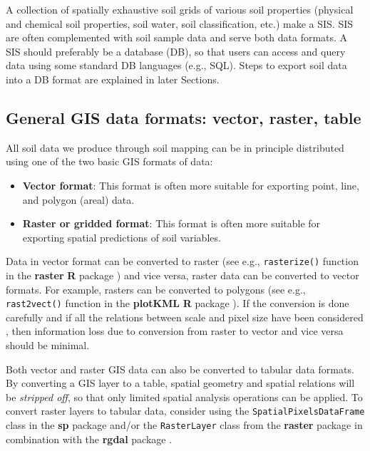 \documentclass[10pt,b5paper,]{book}
\providecommand{\tightlist}{%
  \setlength{\itemsep}{0pt}\setlength{\parskip}{0pt}}
\theoremstyle{definition}
\theoremstyle{definition}
\theoremstyle{definition}
\theoremstyle{remark}
\begin{document}
A collection of spatially exhaustive soil grids of various soil
properties (physical and chemical soil properties, soil water, soil
classification, etc.) make a SIS. SIS are often complemented with soil
sample data and serve both data formats. A SIS should preferably be a
database (DB), so that users can access and query data using some
standard DB languages (e.g., SQL). Steps to export soil data into a DB
format are explained in later Sections.

\hypertarget{general-gis-data-formats-vector-raster-table}{%
\subsection{General GIS data formats: vector, raster,
table}\label{general-gis-data-formats-vector-raster-table}}

All soil data we produce through soil mapping can be in principle
distributed using one of the two basic GIS formats of data:

\begin{itemize}
\tightlist
\item
  \textbf{Vector format}: This format is often more suitable for
  exporting point, line, and polygon (areal) data.
\item
  \textbf{Raster or gridded format}: This format is often more suitable
  for exporting spatial predictions of soil variables.
\end{itemize}

Data in vector format can be converted to raster (see e.g.,
\texttt{rasterize()} function in the \textbf{raster} \textbf{R} package
) and vice versa, raster data can be converted to vector formats. For
example, rasters can be converted to polygons (see e.g.,
\texttt{rast2vect()} function in the \textbf{plotKML} \textbf{R} package
). If the conversion is done carefully and if all the relations between
scale and pixel size have been considered \citep[see][ for more
details]{hengl2006finding}, then information loss due to conversion from
raster to vector and vice versa should be minimal.

Both vector and raster GIS data can also be converted to tabular data
formats. By converting a GIS layer to a table, spatial geometry and
spatial relations will be \emph{stripped off}, so that only limited
spatial analysis operations can be applied. To convert raster layers to
tabular data, consider using the \texttt{SpatialPixelsDataFrame} class
in the \textbf{sp} package and/or the \texttt{RasterLayer} class from
the \textbf{raster} package in combination with the \textbf{rgdal}
package \citep{bivand2013classes}.
\end{document}
